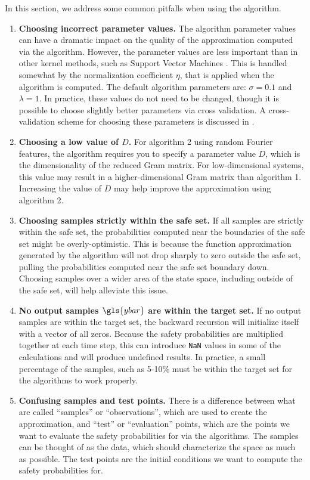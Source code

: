 \documentclass[11pt]{article}
\begin{document}
In this section, we address some common pitfalls when using the algorithm.

\begin{enumerate}
  \item
  \textbf{Choosing incorrect parameter values.} The algorithm parameter values
  can have a dramatic impact on the quality of the approximation computed via
  the algorithm. However, the parameter values are less important than in other
  kernel methods, such as Support Vector Machines \cite{drucker1997support}. This is handled
  somewhat by the normalization coefficient $\eta$, that is applied when the
  algorithm is computed. The default algorithm parameters are: $\sigma = 0.1$
  and $\lambda = 1$. In practice, these values do not need to be changed, though
  it is possible to choose slightly better parameters via cross validation. A
  cross-validation scheme for choosing these parameters is discussed in
  \cite{micchelli2005learning}.

  \item
  \textbf{Choosing a low value of $D$.} For algorithm 2 using random Fourier features, the algorithm requires you to specify a parameter value $D$, which is the dimensionality of the reduced Gram matrix. For low-dimensional systems, this value may result in a higher-dimensional Gram matrix than algorithm 1. Increasing the value of $D$ may help improve the approximation using algorithm 2.

  \item
  \textbf{Choosing samples strictly within the safe set.} If all samples are
  strictly within the safe set, the probabilities computed near the boundaries
  of the safe set might be overly-optimistic. This is because the function
  approximation generated by the algorithm will not drop sharply to zero outside
  the safe set, pulling the probabilities computed near the safe set boundary
  down. Choosing samples over a wider area of the state space, including outside
  of the safe set, will help alleviate this issue.

  \item
  \textbf{No output samples $\gls{ybar}$ are within the target set.} If no
  output samples are within the target set, the backward recursion will
  initialize itself with a vector of all zeros. Because the safety probabilities
  are multiplied together at each time step, this can introduce \verb|NaN|
  values in some of the calculations and will produce undefined results. In
  practice, a small percentage of the samples, such as 5-10\% must be within the
  target set for the algorithms to work properly.

  \item
  \textbf{Confusing samples and test points.} There is a difference between what are called ``samples'' or ``observations'', which are used to create the approximation, and ``test'' or ``evaluation'' points, which are the points we want to evaluate the safety probabilities for via the algorithms. The samples can be thought of as the data, which should characterize the space as much as possible. The test points are the initial conditions we want to compute the safety probabilities for.
\end{enumerate}
\end{document}
